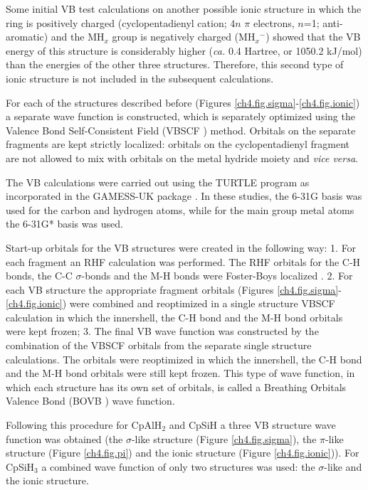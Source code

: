 Some initial VB test calculations on another possible ionic structure in which the ring is positively charged (cyclopentadienyl cation; $4n$ $\pi$ electrons, $n$=1; anti-aromatic) and the MH$_x$ group is negatively charged (MH${_x}{^-}$) showed that the VB energy of this structure is considerably higher (\textit{ca.} 0.4 Hartree, or 1050.2 kJ/mol) than the energies of the other three structures. Therefore, this second type of ionic structure is not included in the subsequent calculations.

For each of the structures described before (Figures \ref{ch4.fig.sigma}-\ref{ch4.fig.ionic}) a separate wave function is constructed, which is separately optimized using the Valence Bond Self-Consistent Field (VBSCF \cite{vbscf1,vbscf2}) method. Orbitals on the separate fragments are kept strictly localized: orbitals on the cyclopentadienyl fragment are not allowed to mix with orbitals on the metal hydride moiety and \textit{vice versa}.

The VB calculations were carried out using the \mbox{TURTLE} program \cite{turtle} as incorporated in the GAMESS-UK package \cite{gamess}. In these studies, the \mbox{6-31G} basis was used for the carbon and hydrogen atoms, while for the main group metal atoms the 6-31G* basis was used. 

Start-up orbitals for the VB structures were created in the following way: 1. For each fragment an RHF calculation was performed. The RHF orbitals for the C-H bonds, the C-C $\sigma$-bonds and the M-H bonds were Foster-Boys localized \cite{foster}. 2. For each VB structure the appropriate fragment orbitals (Figures \ref{ch4.fig.sigma}-\ref{ch4.fig.ionic}) were combined and reoptimized in a single structure VBSCF calculation in which the innershell, the C-H bond and the M-H bond orbitals were kept frozen; 3. The final VB wave function was constructed by the combination of the VBSCF orbitals from the separate single structure calculations. The orbitals were reoptimized in which the innershell, the C-H bond and the M-H bond orbitals were still kept frozen. This type of wave function, in which each structure has its own set of orbitals, is called a Breathing Orbitals Valence Bond (BOVB \cite{bovb1,bovb2}) wave function. 

Following this procedure  for CpAlH$_2$ and CpSiH a three VB structure wave function was obtained (the $\sigma$-like structure (Figure \ref{ch4.fig.sigma}), the $\pi$-like structure (Figure \ref{ch4.fig.pi}) and the ionic structure (Figure \ref{ch4.fig.ionic})). For CpSiH$_3$ a combined wave function of only two structures was used: the $\sigma$-like and the ionic structure.

